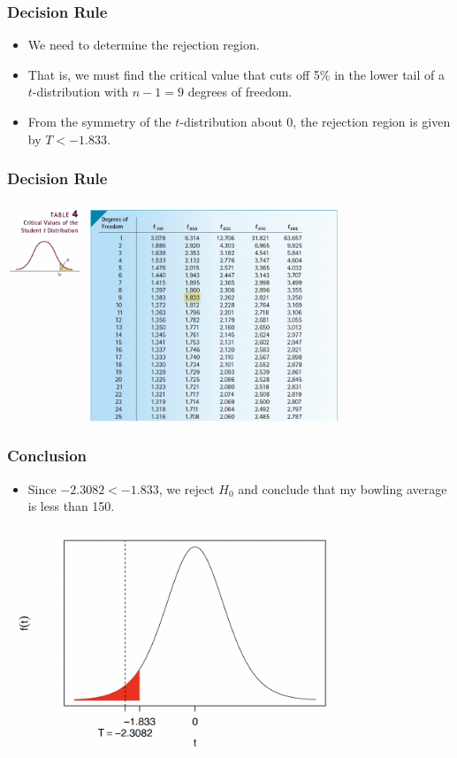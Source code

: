 \documentclass[14pt]{beamer}
\begin{document}
\begin{frame}
	\frametitle{Decision Rule}
	
	\begin{itemize}[label={\color{blue}$\blacktriangleright$}]
		\item We need to determine the rejection region.
		
		\item That is, we must find the critical value that cuts off 5\% in the lower tail of a $t$-distribution with $n - 1 = 9$ degrees of freedom.
		
		\item From the symmetry of the $t$-distribution about 0, the rejection region is given by $T < -1.833$.
	\end{itemize}
	
\end{frame}
\begin{frame}
	\frametitle{Decision Rule}
	\centering
\includegraphics[width=10cm]{decision.png}	
\end{frame}
\begin{frame}
	\frametitle{Conclusion}
\begin{itemize}[label={\color{blue}$\blacktriangleright$}]
	\item Since $-2.3082<-1.833$, we reject $H_0$ and conclude that my bowling average is less than 150.
\end{itemize}
	\centering
	\includegraphics[width=10cm]{conclusion.png}	
\end{frame}
\end{document}
